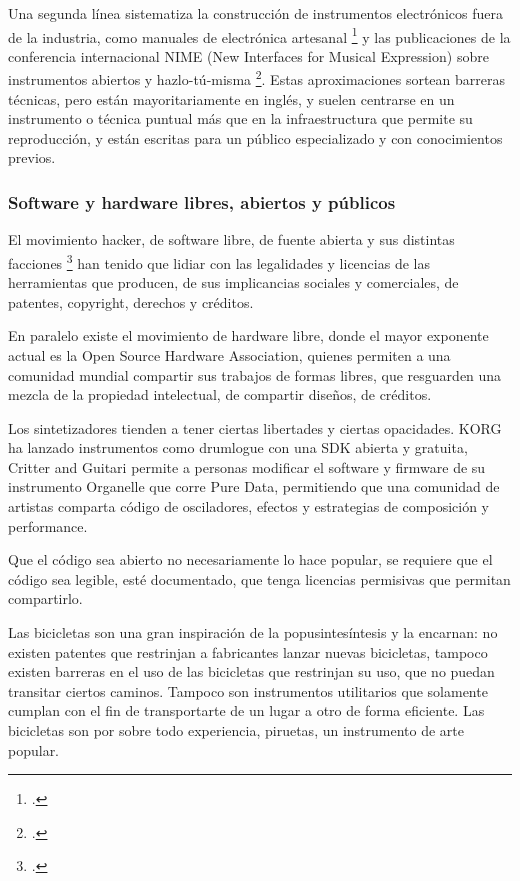 \documentclass[../candidatura.tex]{subfiles}
\begin{document}
Una segunda línea sistematiza la construcción de instrumentos electrónicos fuera de la industria, como manuales de electrónica artesanal \footcite{collins_handmade_2020} y las publicaciones de la conferencia internacional NIME (New Interfaces for Musical Expression) sobre instrumentos abiertos y hazlo-tú-misma \footcite{nime_sinfecha}. Estas aproximaciones sortean barreras técnicas, pero están mayoritariamente en inglés, y suelen centrarse en un instrumento o técnica puntual más que en la infraestructura que permite su reproducción, y están escritas para un público especializado y con conocimientos previos.

\subsubsection{Software y hardware libres, abiertos y públicos}

El movimiento hacker, de software libre, de fuente abierta y sus distintas facciones \footcite{tozzi_history_2017} han tenido que lidiar con las legalidades y licencias de las herramientas que producen, de sus implicancias sociales y comerciales, de patentes, copyright, derechos y créditos.

En paralelo existe el movimiento de hardware libre, donde el mayor exponente actual es la Open Source Hardware Association, quienes permiten a una comunidad mundial compartir sus trabajos de formas libres, que resguarden una mezcla de la propiedad intelectual, de compartir diseños, de créditos.

Los sintetizadores tienden a tener ciertas libertades y ciertas opacidades. KORG ha lanzado instrumentos como drumlogue con una SDK abierta y gratuita, Critter and Guitari permite a personas modificar el software y firmware de su instrumento Organelle que corre Pure Data, permitiendo que una comunidad de artistas comparta código de osciladores, efectos y estrategias de composición y performance.

Que el código sea abierto no necesariamente lo hace popular, se requiere que el código sea legible, esté documentado, que tenga licencias permisivas que permitan compartirlo.

Las bicicletas son una gran inspiración de la popusintesíntesis y la encarnan: no existen patentes que restrinjan a fabricantes lanzar nuevas bicicletas, tampoco existen barreras en el uso de las bicicletas que restrinjan su uso, que no puedan transitar ciertos caminos. Tampoco son instrumentos utilitarios que solamente cumplan con el fin de transportarte de un lugar a otro de forma eficiente. Las bicicletas son por sobre todo experiencia, piruetas, un instrumento de arte popular.
\end{document}
